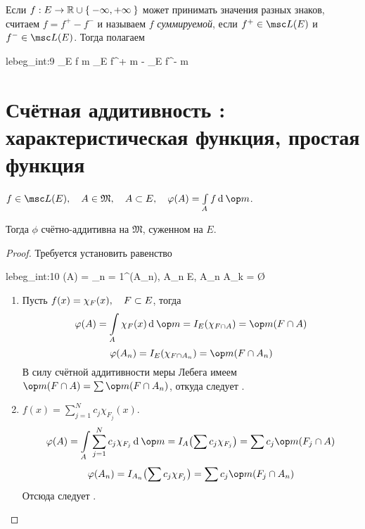 \begin{definition}
	Если $ f : E \to \mathbb{R} \cup \Set{-\infty, +\infty} $ может принимать значения разных знаков, считаем $ f = f^+ - f^- $ и называем $ f $ \emph{суммируемой}, если $ f^+ \in \msc L(E) $ и $ f^- \in \msc L(E) $.
	Тогда полагаем
	\begin{equ}{lebeg_int:9}
		\int\limits_E f \di \op m \coloneq \int\limits_E f^+ \di \op m - \int\limits_E f^- \di \op m
	\end{equ}
\end{definition}

\section{Счётная аддитивность : характеристическая функция, простая функция }

\begin{theorem}
	$ f \in \msc L(E), \quad A \in \mathfrak M, \quad A \sub E, \quad \phi(A) = \int\limits_A f \di \op m $.

	Тогда $ \phi $ счётно-аддитивна на $ \mathfrak M $, суженном на $ E $.
\end{theorem}

\begin{proof}
	Требуется установить равенство
	\begin{equ}{lebeg_int:10}
		\phi(A) = \sum_{n = 1}^\infty \phi(A_n), \quad {} A_n \sub E, \quad A_n \cap A_k = \O
	\end{equ}

	\begin{enumerate}
		\item Пусть $ f(x) = \chi_F(x), \quad F \subset E $, тогда
			$$ \phi(A) = \int\limits_A \chi_F(x) \di \op m = I_E(\chi_{F \cap A}) = \op m (F \cap A) $$
			$$ \phi(A_n) = I_E(\chi_{F \cap A_n}) = \op m (F \cap A_n) $$
			В силу счётной аддитивности меры Лебега имеем $ \op m(F \cap A) = \sum \op m(F \cap A_n) $, откуда следует .

		\item \label{en:lebeg_int:2} $ f(x) = \sum_{j = 1}^N c_j \chi_{F_j}(x) $.
			$$ \phi(A) = \int\limits_A \sum_{j = 1}^N c_j \chi_{F_j} \di \op m = I_A \bigl( \sum c_j \chi_{F_j} \bigr) = \sum c_j \op m(F_j \cap A) $$
			$$ \phi(A_n) = I_{A_n} \bigl( \sum c_j \chi_{F_j} \bigr) = \sum c_j \op m (F_j \cap A_n) $$
			Отсюда следует .
	\end{enumerate}
\end{proof}

